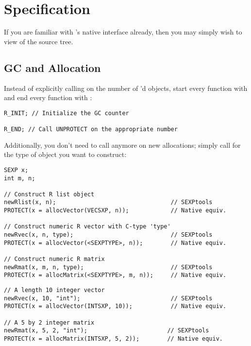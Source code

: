 \section{Specification}\label{specification}

If you are familiar with \R's native \C interface already, then you may simply 
wish to view  of the \thispackage source tree.



\subsection{GC and Allocation}

Instead of explicitly calling  on the number of 
'd objects, start every  function with  
and end every  function with :

\begin{lstlisting}[language=fanC,title=GC Counter]
R_INIT; // Initialize the GC counter

R_END; // Call UNPROTECT on the appropriate number
\end{lstlisting}


Additionally, you don't need to call  anymore on new allocations; 
simply call  for the type of \R object you want to construct:
\begin{lstlisting}[language=fanC,title=Allocation]
SEXP x;
int m, n;

// Construct R list object
newRlist(x, n);                                 // SEXPtools
PROTECT(x = allocVector(VECSXP, n));            // Native equiv.

// Construct numeric R vector with C-type 'type'
newRvec(x, n, type);                            // SEXPtools
PROTECT(x = allocVector(<SEXPTYPE>, n));        // Native equiv.

// Construct numeric R matrix
newRmat(x, m, n, type);                         // SEXPtools
PROTECT(x = allocMatrix(<SEXPTYPE>, m, n));     // Native equiv.
\end{lstlisting}


\begin{lstlisting}[language=fanC,title=Allocation Examples]
// A length 10 integer vector
newRvec(x, 10, "int");                          // SEXPtools
PROTECT(x = allocVector(INTSXP, 10));           // Native equiv.

// A 5 by 2 integer matrix
newRmat(x, 5, 2, "int");                       // SEXPtools
PROTECT(x = allocMatrix(INTSXP, 5, 2));        // Native equiv.
\end{lstlisting}

